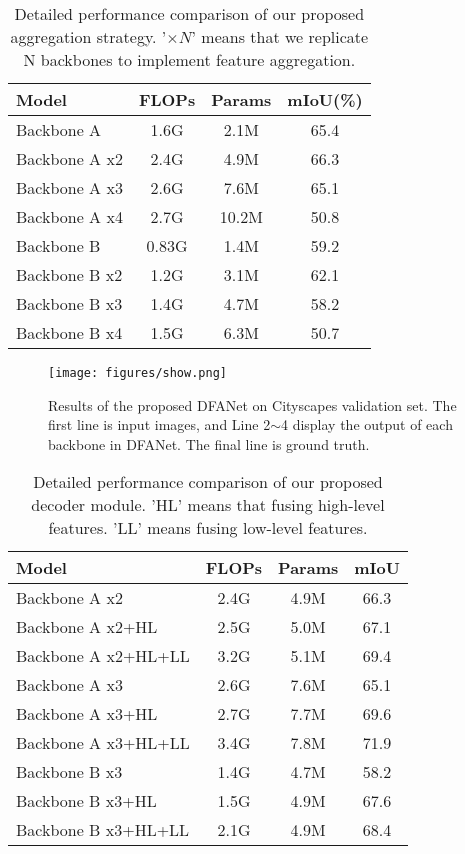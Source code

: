 \documentclass[10pt,twocolumn,letterpaper]{article}
\begin{document}
\begin{table}
\begin{center}
\begin{tabular}{l|c|c|c}
\hline
Model & FLOPs & Params & mIoU(\%) \\
\hline\hline
Backbone A     & 1.6G & 2.1M & 65.4 \\
Backbone A x2  & 2.4G & 4.9M & 66.3 \\
Backbone A x3  & 2.6G & 7.6M & 65.1 \\
Backbone A x4  &2.7G & 10.2M & 50.8 \\
\hline
Backbone B     & 0.83G & 1.4M & 59.2 \\
Backbone B x2  & 1.2G & 3.1M & 62.1 \\
Backbone B x3  & 1.4G & 4.7M & 58.2 \\
Backbone B x4  & 1.5G & 6.3M & 50.7 \\
\hline
\end{tabular}
\end{center}
\caption{Detailed performance comparison of our proposed aggregation strategy. '$\times N$' means that we replicate N backbones to implement feature aggregation.}
\label{tab: feature aggregate comparison}
\end{table}

\begin{figure}
\begin{center}
   \texttt{[image: figures/show.png]}
\end{center}
   \caption{Results of the proposed DFANet on Cityscapes validation set. The first line is input images, and Line 2$\sim$4 display the output of each backbone in DFANet. The final line is ground truth.}
\label{fig:visual results}
\end{figure}




\begin{table}
\begin{center}
\begin{tabular}{l|c|c|c}
\hline
Model & FLOPs & Params & mIoU \\
\hline\hline
Backbone A x2        & 2.4G & 4.9M & 66.3 \\
Backbone A x2+HL     & 2.5G & 5.0M & 67.1 \\
Backbone A x2+HL+LL  & 3.2G & 5.1M & 69.4 \\
\hline
Backbone A x3        & 2.6G & 7.6M & 65.1 \\
Backbone A x3+HL     & 2.7G & 7.7M & 69.6 \\
Backbone A x3+HL+LL  & 3.4G & 7.8M & 71.9 \\
\hline
Backbone B x3        & 1.4G & 4.7M & 58.2 \\
Backbone B x3+HL     & 1.5G & 4.9M & 67.6 \\
Backbone B x3+HL+LL  & 2.1G & 4.9M & 68.4 \\
\hline
\end{tabular}
\end{center}
\caption{Detailed performance comparison of our proposed decoder module. 'HL' means that fusing high-level features. 'LL' means fusing low-level features.}
\label{tab:decoder results}
\end{table}
\end{document}
